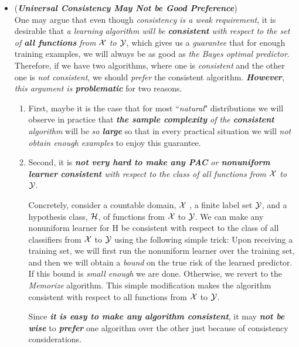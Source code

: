 \documentclass[11pt]{article}
\begin{document}
\begin{itemize}
\item \begin{remark} (\emph{\textbf{Universal Consistency May Not be Good Preference}}) \citep{shalev2014understanding}\\
One may argue that even though \emph{consistency is a weak requirement}, it is desirable that \emph{a learning algorithm will be \textbf{consistent} with respect to the set of \textbf{all functions} from ${\mathcal X}$ to ${\mathcal Y}$}, which gives us a \emph{guarantee} that for enough training examples, we will always be as good as \emph{the Bayes optimal predictor}. Therefore, if we have two algorithms, where one is \emph{consistent} and the other one is \emph{not consistent}, we should \emph{prefer} the consistent algorithm. \emph{\textbf{However}}, \emph{this argument is \textbf{problematic}} for two reasons.
\begin{enumerate}
\item First, maybe it is the case that for most ``\emph{natural}" distributions we will observe in practice that \emph{\textbf{the sample complexity} of the \textbf{consistent} algorithm} will be \emph{so \textbf{large}} so that in every practical situation we will \emph{not obtain enough examples} to enjoy this guarantee. 

\item Second, it is \emph{\textbf{not very hard to make any PAC} or \textbf{nonuniform learner} \textbf{consistent} with respect to the class of all functions from ${\mathcal X}$ to ${\mathcal Y}$}. 

Concretely, consider a countable domain, ${\mathcal X}$ , a finite label set ${\mathcal Y}$, and a hypothesis class, ${\mathcal H}$, of functions from ${\mathcal X}$ to ${\mathcal Y}$. We can make any nonuniform learner for H be consistent with respect to the class of all classifiers from ${\mathcal X}$ to ${\mathcal Y}$ using the following simple trick: Upon receiving a training set, we will first run the nonuniform learner over the training set, and then we will obtain a \emph{bound} on the true risk of the learned predictor. If this bound is \emph{small enough} we are done. Otherwise, we revert to the \emph{Memorize} algorithm. This simple modification makes the algorithm consistent with respect to all functions from ${\mathcal X}$ to ${\mathcal Y}$. 

Since \emph{\textbf{it is easy to make any algorithm consistent}}, it may \emph{\textbf{not be wise}} to \emph{\textbf{prefer}} one algorithm over the other just because of consistency considerations.
\end{enumerate}
\end{remark}
\end{itemize}


\newpage


\end{document}
